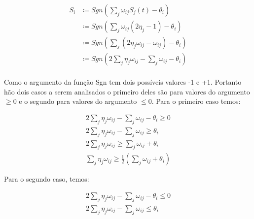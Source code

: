 \begin{tcolorbox}[colback=white!5,colframe=white!40!black,title= Demonstração]

\begin{eqnarray*}
		S_{i} & \coloneqq Sgn (\sum\limits_{j} \omega_{ij} S_{j}(t) - \theta_{i} ) \\
		          &  \coloneqq Sgn (\sum\limits_{j} \omega_{ij} ( 2\eta_{j}-1) - \theta_{i} ) \\
		          &  \coloneqq Sgn (\sum\limits_{j}( 2\eta_{j} \omega_{ij} - \omega_{ij} ) - \theta_{i} ) \\
		          &  \coloneqq Sgn (2 \sum\limits_{j}\eta_{j} \omega_{ij} - \sum\limits_{j} \omega_{ij} - \theta_{i})\\
\end{eqnarray*}

Como o argumento da função Sgn tem dois possíveis valores -1 e +1. Portanto hão dois casos a serem analisados o primeiro deles são para valores do argumento $\geq 0$ e o segundo para valores do argumento $\leq 0$.  Para o primeiro caso temos:

\begin{eqnarray*}
	2 \sum_j \eta_j \omega_{ij} - \sum_j \omega_{ij} - \theta_{i}  \geq 0 \\
	2 \sum_j \eta_j \omega_{ij} - \sum_j \omega_{ij} \geq \theta_i  \\
	2 \sum_j \eta_j \omega_{ij}  \geq \sum_j \omega_{ij} +  \theta_i  \\
	\sum_j \eta_j \omega_{ij} \geq \frac{1}{2} \left( \sum_j \omega_{ij} + \theta_i \right)
\end{eqnarray*}

Para o segundo caso, temos:

\begin{eqnarray*}
	2 \sum_j \eta_j \omega_{ij} - \sum_j \omega_{ij} - \theta_{i}  \leq 0 \\
	2 \sum_j \eta_j \omega_{ij} - \sum_j \omega_{ij} \leq \theta_i  \\
\end{eqnarray*}

\end{tcolorbox}

